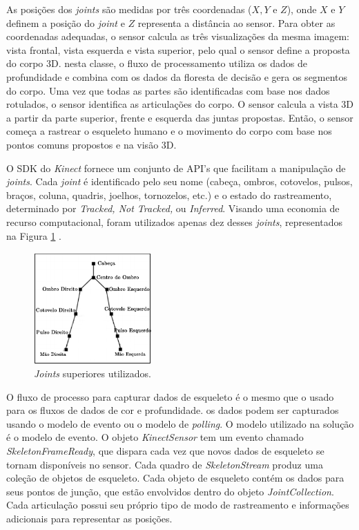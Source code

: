 As posições dos \textit{joints} são medidas por três coordenadas ($X, Y$ e $Z$), onde $X$ e $Y$ definem a posição do \textit{joint} e $Z$ representa a distância ao sensor. Para obter as coordenadas adequadas, o sensor calcula as três visualizações da mesma imagem: vista frontal, vista esquerda e vista superior, pelo qual o sensor define a proposta do corpo 3D. nesta classe, o fluxo de processamento  utiliza os dados de profundidade e combina com os dados da floresta de decisão e gera os segmentos do corpo. Uma vez que todas as partes são identificadas com base nos dados rotulados, o sensor identifica as articulações do corpo. O sensor calcula a vista 3D a partir da parte superior, frente e esquerda das juntas propostas. Então, o sensor começa a rastrear o esqueleto humano e o movimento do corpo com base nos pontos comuns propostos e na visão 3D.

O SDK do \textit{Kinect} fornece um conjunto de API's que facilitam a manipulação de \textit{joints}. Cada \textit{joint} é identificado pelo seu nome (cabeça, ombros, cotovelos, pulsos, braços, coluna, quadris, joelhos, tornozelos, etc.) e o estado do rastreamento, determinado por \textit{Tracked, Not Tracked,} ou \textit{Inferred}. Visando uma economia de recurso computacional, foram utilizados apenas dez desses \textit{joints}, representados na Figura  \ref{fig:human_joints2} .

\begin{figure}[ht]
\centering
\includegraphics[width=0.4\textwidth]{images/human_joints_2.png}
\caption{\textit{Joints} superiores utilizados.}
\label{fig:human_joints2}
\end{figure}

O fluxo de processo para capturar dados de esqueleto é o mesmo que o usado para os fluxos de dados de cor e profundidade. os dados podem ser capturados usando o modelo de evento ou o modelo de \textit{polling}. O modelo utilizado na solução é o modelo de evento.  O objeto \textit{KinectSensor} tem um evento chamado \textit{SkeletonFrameReady}, que dispara cada vez que novos dados de esqueleto se tornam disponíveis no sensor. Cada quadro de \textit{SkeletonStream} produz uma coleção de objetos de esqueleto. Cada objeto de esqueleto contém os dados para seus pontos de junção, que estão envolvidos dentro do objeto \textit{JointCollection}. Cada articulação possui seu próprio tipo de modo de rastreamento e informações adicionais para representar as posições.

